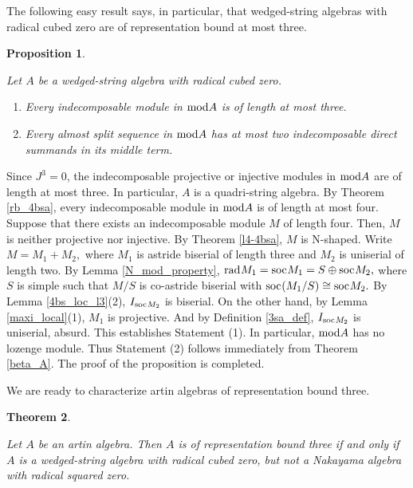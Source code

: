 \documentclass[10pt]{amsart}
\newtheorem{Theo}{Theorem}[subsection]
\newtheorem{Prop}[Theo]{Proposition}
\theoremstyle{definition}
\newcommand{\mmod}{{\rm mod}}
\newcommand{\rad}{{\rm rad}\hspace{.5pt}}
\newcommand{\soc}{{\rm soc}\hspace{.5pt}}
\begin{document}
\smallskip

The following easy result says, in particular, that wedged-string algebras with radical cubed zero are of representation bound at most three.

\begin{Prop}\label{3sa_rb}

Let $A$ be a wedged-string algebra with radical cubed zero.

\begin{enumerate}[$(1)$]

\vspace{-1.5pt}

\item Every indecomposable module in $\mmod A$ is of length at most three.

\item Every almost split sequence in $\mmod A$ has at most two indecomposable direct summands in its middle term.
    
\end{enumerate}\end{Prop}

\vspace{-1.5pt}

 Since $J^3=0$, the indecomposable projective or injective modules in $\mmod A$ are of length at most three. In particular, $A$ is a quadri-string algebra. By Theorem \ref{rb_4bsa}, every indecomposable module in $\mmod A$ is of length at most four. Suppose that there exists an indecomposable module $M$ of length four. Then, $M$ is neither projective nor injective. By Theorem \ref{l4-4bsa}, $M$ is N-shaped. Write $M=M_1+M_2,$ where $M_1$ is astride biserial of length three and $M_2$ is uniserial of length two. By Lemma \ref{N_mod_property}, $\rad M_1=\soc M_1=S \oplus \soc M_2,$ where $S$ is simple such that $M/S$ is co-astride biserial with $\soc(M_1/S)\cong \soc M_2.$ By Lemma \ref{4bs_loc_l3}(2), $I_{\soc M_2}$ is biserial. On the other hand, by Lemma \ref{maxi_local}(1), $M_1$ is projective. And by Definition \ref{3sa_def}, $I_{\soc M_2}$ is uniserial, absurd. This establishes Statement (1). In particular, $\mmod A$ has no lozenge module. Thus Statement (2) follows immediately from Theorem \ref{beta_A}. The proof of the proposition is completed.

\smallskip

We are ready to characterize artin algebras of representation bound three.

\begin{Theo}\label{rb3} 

Let $A$ be an artin algebra. Then $A$ is of representation bound three if and only if $A$ is a wedged-string algebra with radical cubed zero, but not a Nakayama algebra with radical squared zero. 

\end{Theo}
\end{document}
